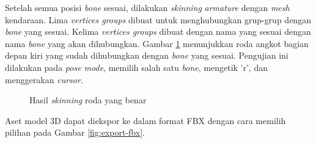 
Setelah semua posisi \textit{bone} sesuai, dilakukan \textit{skinning}
\textit{armature} dengan \textit{mesh} kendaraan. Lima \textit{vertices groups}
dibuat untuk menghubungkan grup-grup dengan \textit{bone} yang sesuai. Kelima
\textit{vertices groups} dibuat dengan nama yang sesuai dengan nama
\textit{bone} yang akan dihubungkan. Gambar \ref{fig:wheel-skinning} menunjukkan
roda angkot bagian depan kiri yang sudah dihubungkan dengan \textit{bone} yang
sesuai. Pengujian ini dilakukan pada \textit{pose mode}, memilih salah satu
\textit{bone}, mengetik 'r', dan menggerakan \textit{cursor}.

\begin{figure}[ht]
	\centering
	\hfill
	\caption{Hasil \textit{skinning} roda yang benar}
	\label{fig:wheel-skinning}
\end{figure}

Aset model 3D dapat diekspor ke dalam format FBX dengan cara memilih pilihan
pada Gambar \ref{fig:export-fbx}.

